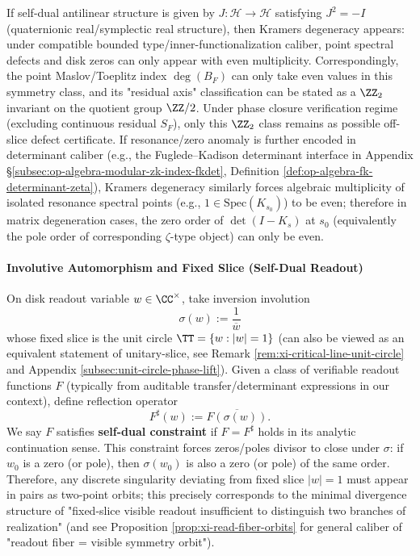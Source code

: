 \begin{remark}[Quaternionic Real Type (\(J^2=-I\)) Even Multiplicity and \texorpdfstring{$\ZZ_2$}{Z2} Indexing]\label{rem:selfdual-quaternionic-z2}
If self-dual antilinear structure is given by \(J:\mathcal H\to\mathcal H\) satisfying \(J^2=-I\) (quaternionic real/symplectic real structure), then Kramers degeneracy appears: under compatible bounded type/inner-functionalization caliber, point spectral defects and disk zeros can only appear with even multiplicity.
Correspondingly, the point Maslov/Toeplitz index \(\deg(B_F)\) can only take even values in this symmetry class, and its "residual axis" classification can be stated as a \(\ZZ_2\) invariant on the quotient group \(\ZZ/2\).
Under phase closure verification regime (excluding continuous residual \(S_F\)), only this \(\ZZ_2\) class remains as possible off-slice defect certificate.
If resonance/zero anomaly is further encoded in determinant caliber (e.g., the Fuglede–Kadison determinant interface in Appendix \S\ref{subsec:op-algebra-modular-zk-index-fkdet}, Definition \ref{def:op-algebra-fk-determinant-zeta}), Kramers degeneracy similarly forces algebraic multiplicity of isolated resonance spectral points (e.g., \(1\in\mathrm{Spec}(K_{s_0})\)) to be even; therefore in matrix degeneration cases, the zero order of \(\det(I-K_s)\) at \(s_0\) (equivalently the pole order of corresponding \(\zeta\)-type object) can only be even.
\end{remark}

\paragraph{Involutive Automorphism and Fixed Slice (Self-Dual Readout)}

On disk readout variable \(w\in\CC^\times\), take inversion involution
\[
\boxed{\;\sigma(w):=\frac{1}{\overline{w}}\;}
\]
whose fixed slice is the unit circle \(\TT=\{w:|w|=1\}\) (can also be viewed as an equivalent statement of unitary-slice, see Remark \ref{rem:xi-critical-line-unit-circle} and Appendix \ref{subsec:unit-circle-phase-lift}).
Given a class of verifiable readout functions \(F\) (typically from auditable transfer/determinant expressions in our context), define reflection operator
\[
F^\sharp(w):=\overline{F(\sigma(w))}.
\]
We say \(F\) satisfies \textbf{self-dual constraint} if \(F=F^\sharp\) holds in its analytic continuation sense.
This constraint forces zeros/poles divisor to close under \(\sigma\): if \(w_0\) is a zero (or pole), then \(\sigma(w_0)\) is also a zero (or pole) of the same order.
Therefore, any discrete singularity deviating from fixed slice \(|w|=1\) must appear in pairs as two-point orbits; this precisely corresponds to the minimal divergence structure of "fixed-slice visible readout insufficient to distinguish two branches of realization" (and see Proposition \ref{prop:xi-read-fiber-orbits} for general caliber of "readout fiber = visible symmetry orbit").

